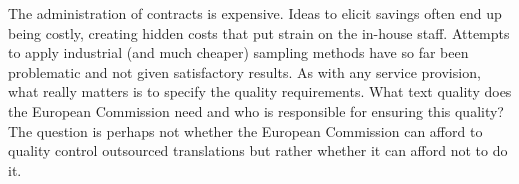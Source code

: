 \documentclass[output=paper]{langsci/langscibook}
\begin{document}
The administration of contracts is expensive. Ideas to elicit savings often end up being costly, creating hidden costs that put strain on the in-house staff. Attempts to apply industrial (and much cheaper) sampling methods have so far been problematic and not given satisfactory results. As with any service provision, what really matters is to specify the quality requirements. What text quality does the European Commission need and who is responsible for ensuring this quality? The question is perhaps not whether the European Commission can afford to quality control outsourced translations but rather whether it can afford not to do it.
%  

\sloppy
\printbibliography[heading=subbibliography,notkeyword=this] 
\end{document}
